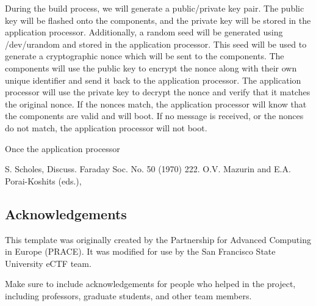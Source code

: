 \documentclass{prace}
\begin{document}
During the build process, we will generate a public/private key pair. The public key will be
flashed onto the components, and the private key will be stored in the application processor.
Additionally, a random seed will be generated using /dev/urandom and stored in the application
processor. This seed will be used to generate a cryptographic nonce which will be sent to the
components. The components will use the public key to encrypt the nonce along with their own
unique identifier and send it back to the application processor. The application processor will
use the private key to decrypt the nonce and verify that it matches the original nonce. If the
nonces match, the application processor will know that the components are valid and will boot.
If no message is received, or the nonces do not match, the application processor will not boot.

Once the application processor 

%
\begin{thebibliography}{99}
	S. Scholes, Discuss. Faraday Soc. No. 50 (1970) 222.
	O.V. Mazurin and E.A. Porai-Koshits (eds.),
\end{thebibliography}

\subsection*{Acknowledgements}
This template was originally created by the Partnership for Advanced Computing
in Europe (PRACE). It was modified for use by the San Francisco State University
eCTF team.

Make sure to include acknowledgements for people who helped in the project,
including professors, graduate students, and other team members.

\end{document}

